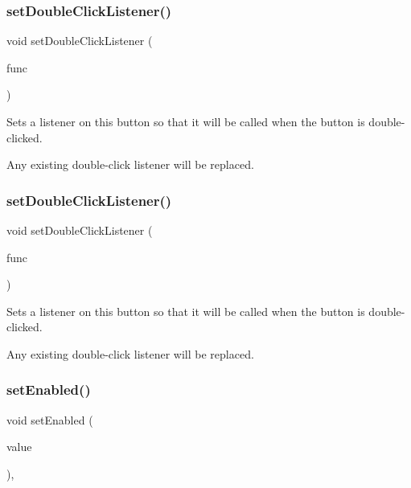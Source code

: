 \subsubsection{\texorpdfstring{set\+Double\+Click\+Listener()}{setDoubleClickListener()}\hspace{0.1cm}{\footnotesize\ttfamily [1/2]}}
{\footnotesize\ttfamily void set\+Double\+Click\+Listener (\begin{DoxyParamCaption}\item[{G\+Event\+Listener}]{func }\end{DoxyParamCaption})\hspace{0.3cm}{\ttfamily [virtual]}}



Sets a listener on this button so that it will be called when the button is double-\/clicked. 

Any existing double-\/click listener will be replaced. \mbox{\label{classGButton_a50096194d66f48c92dd4c512d41bfc76}} 
\subsubsection{\texorpdfstring{set\+Double\+Click\+Listener()}{setDoubleClickListener()}\hspace{0.1cm}{\footnotesize\ttfamily [2/2]}}
{\footnotesize\ttfamily void set\+Double\+Click\+Listener (\begin{DoxyParamCaption}\item[{G\+Event\+Listener\+Void}]{func }\end{DoxyParamCaption})\hspace{0.3cm}{\ttfamily [virtual]}}



Sets a listener on this button so that it will be called when the button is double-\/clicked. 

Any existing double-\/click listener will be replaced. \mbox{\label{classGInteractor_ab831367dd84bbd579e02e55bacb21343}} 
\subsubsection{\texorpdfstring{set\+Enabled()}{setEnabled()}}
{\footnotesize\ttfamily void set\+Enabled (\begin{DoxyParamCaption}\item[{bool}]{value }\end{DoxyParamCaption})\hspace{0.3cm}{\ttfamily [virtual]}, {\ttfamily [inherited]}}



